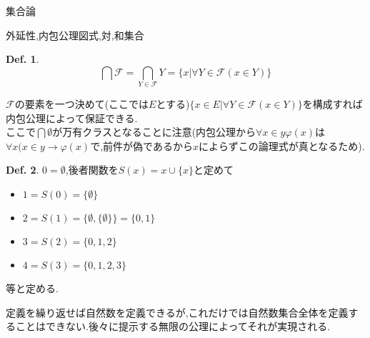 \documentclass[14pt]{jsarticle}
\theoremstyle{definition}
\newtheorem{dfn}{Def.}[subsection]
\begin{document}
\begin{section}{集合論}
\begin{subsection}{外延性,内包公理図式,対,和集合}
\begin{dfn}
\label{bigcapdef}
$$\bigcap{\mathcal F} = \bigcap_{Y \in {\mathcal F}} Y = \{x|\forall Y \in {\mathcal F} ( x \in Y)\}$$
\end{dfn}
${\mathcal F}$の要素を一つ決めて(ここでは$E$とする)$\{x\in E|\forall Y \in {\mathcal F} (x \in Y)\}$を構成すれば内包公理によって保証できる.\\
ここで$\bigcap \emptyset$が万有クラスとなることに注意(内包公理から$\forall x \in y \varphi(x)$は$\forall x(x \in y \to \varphi(x)$で,前件が偽であるから$x$によらずこの論理式が真となるため).
\begin{dfn}
\label{sucdef}
$0=\emptyset$,後者関数を$S(x)=x\cup\{x\}$と定めて
\begin{itemize}
	\item $1=S(0)=\{\emptyset\}$
	\item $2=S(1)=\{\emptyset,\{\emptyset\}\}=\{0,1\}$
	\item $3=S(2)=\{0,1,2\}$
	\item $4=S(3)=\{0,1,2,3\}$
\end{itemize}
等と定める.
\end{dfn}
定義を繰り返せば自然数を定義できるが,これだけでは自然数集合全体を定義することはできない.後々に提示する無限の公理によってそれが実現される.
\end{subsection}


\end{section}
\end{document}

